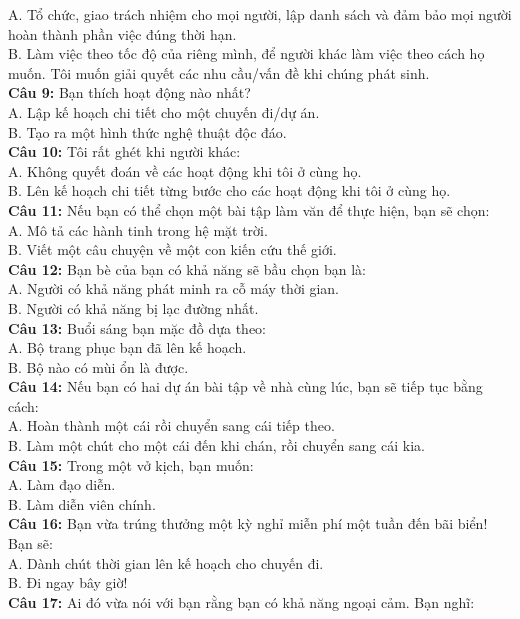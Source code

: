\begin{multicols}{2}
A. Tổ chức, giao trách nhiệm cho mọi người, lập danh sách và đảm bảo mọi người hoàn thành phần việc đúng thời hạn. \\
B. Làm việc theo tốc độ của riêng mình, để người khác làm việc theo cách họ muốn. Tôi muốn giải quyết các nhu cầu/vấn đề khi chúng phát sinh. \\
\textbf{Câu 9:} Bạn thích hoạt động nào nhất? \\
A. Lập kế hoạch chi tiết cho một chuyến đi/dự án. \\
B. Tạo ra một hình thức nghệ thuật độc đáo. \\
\textbf{Câu 10:} Tôi rất ghét khi người khác: \\
A. Không quyết đoán về các hoạt động khi tôi ở cùng họ. \\
B. Lên kế hoạch chi tiết từng bước cho các hoạt động khi tôi ở cùng họ. \\
\textbf{Câu 11:} Nếu bạn có thể chọn một bài tập làm văn để thực hiện, bạn sẽ chọn: \\
A. Mô tả các hành tinh trong hệ mặt trời. \\
B. Viết một câu chuyện về một con kiến cứu thế giới. \\
\textbf{Câu 12:} Bạn bè của bạn có khả năng sẽ bầu chọn bạn là: \\
A. Người có khả năng phát minh ra cỗ máy thời gian. \\
B. Người có khả năng bị lạc đường nhất. \\
\textbf{Câu 13:} Buổi sáng bạn mặc đồ dựa theo: \\
A. Bộ trang phục bạn đã lên kế hoạch. \\
B. Bộ nào có mùi ổn là được. \\
\textbf{Câu 14:} Nếu bạn có hai dự án bài tập về nhà cùng lúc, bạn sẽ tiếp tục bằng cách: \\
A. Hoàn thành một cái rồi chuyển sang cái tiếp theo. \\
B. Làm một chút cho một cái đến khi chán, rồi chuyển sang cái kia. \\
\textbf{Câu 15:} Trong một vở kịch, bạn muốn: \\
A. Làm đạo diễn. \\
B. Làm diễn viên chính. \\
\textbf{Câu 16:} Bạn vừa trúng thưởng một kỳ nghỉ miễn phí một tuần đến bãi biển! Bạn sẽ: \\
A. Dành chút thời gian lên kế hoạch cho chuyến đi. \\
B. Đi ngay bây giờ! \\
\textbf{Câu 17:} Ai đó vừa nói với bạn rằng bạn có khả năng ngoại cảm. Bạn nghĩ: \\

\end{multicols}
